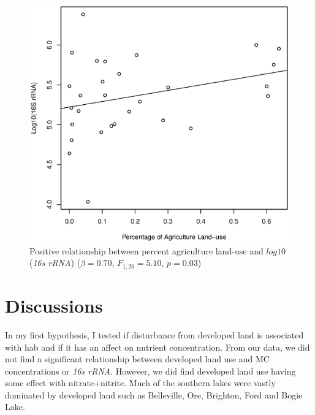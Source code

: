 \begin{figure}[!ht]
  \includegraphics[width=\textwidth]{figures/Agriculture}
  \caption{Positive relationship between percent agriculture land-use and $log10$(\emph{16s rRNA}) ($\beta=0.70$, $F_{{1,26}}=5.10$, $p=0.03$)}
  \label{fig:agriculture}
\end{figure}
\clearpage



\section{Discussions}


In my first hypothesis, I tested if disturbance from developed land is associated with \gls{hab} and if it has an affect on nutrient concentration.  From our data, we did not find a significant relationship between developed land use and MC concentrations or \emph{16s rRNA}. However, we did find developed land use having some effect with nitrate+nitrite. 
Much of the southern lakes were vastly dominated by developed land such as Belleville, Ore, Brighton, Ford and Bogie Lake. 


